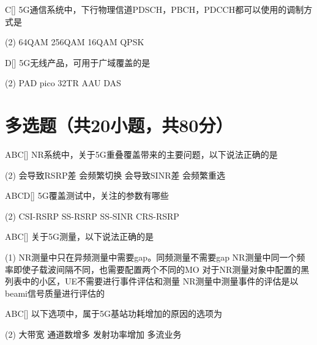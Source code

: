 \begin{choice}{C}[]
    5G通信系统中，下行物理信道PDSCH，PBCH，PDCCH都可以使用的调制方式是
    \begin{tasks}(2)
        \task 64QAM
        \task 256QAM
        \task 16QAM
        \task QPSK
    \end{tasks}
\end{choice}


\begin{choice}{D}[]
    5G无线产品，可用于广域覆盖的是
    \begin{tasks}(2)
        \task PAD
        \task pico
        \task 32TR AAU
        \task DAS
    \end{tasks}
\end{choice}

\section{多选题（共20小题，共80分）}

\begin{choice}{\;ABC\;}[]
    NR系统中，关于5G重叠覆盖带来的主要问题，以下说法正确的是
    \begin{tasks}(2)
        \task 会导致RSRP差
        \task 会频繁切换
        \task 会导致SINR差
        \task 会频繁重选
    \end{tasks}
\end{choice}

\begin{choice}{\;ABCD\;}[]
    5G覆盖测试中，关注的参数有哪些
    \begin{tasks}(2)
        \task CSI-RSRP
        \task SS-RSRP
        \task SS-SINR
        \task CRS-RSRP
    \end{tasks}
\end{choice}

\begin{choice}{\;ABC\;}[]
    关于5G测量，以下说法正确的是
    \begin{tasks}(1)
        \task NR测量中只在异频测量中需要gap。同频测量不需要gap
        \task NR测量中同一个频率即使子载波间隔不同，也需要配置两个不同的MO
        \task 对于NR测量对象中配置的黑列表中的小区，UE不需要进行事件评估和测量
        \task NR测量中测量事件的评估是以beami信号质量进行评估的
    \end{tasks}
\end{choice}

\begin{choice}{\;ABC\;}[]
    以下选项中，属于5G基站功耗增加的原因的选项为
    \begin{tasks}(2)
        \task 大带宽
        \task 通道数增多
        \task 发射功率增加
        \task 多流业务
    \end{tasks}
\end{choice}


